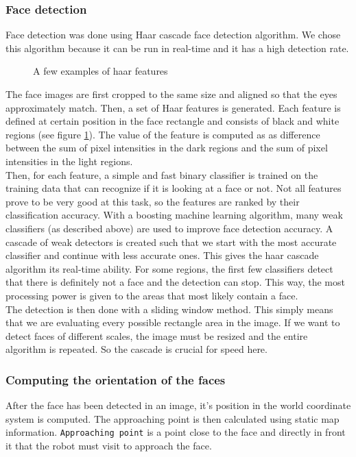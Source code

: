 \documentclass[12pt,a4paper]{article}
\begin{document}
	\subsubsection{Face detection} \label{face_detection_algorithm}
	
	Face detection was done using Haar cascade face detection algorithm. We chose this algorithm because it can be run in real-time and it has a high detection rate. \\
	
	\begin{figure}[h]
		\centering
		\caption{A few examples of haar features}
		\label{fig:haar_features}
	\end{figure}
	
	The face images are first cropped to the same size and aligned so that the eyes approximately match. Then, a set of Haar features is generated. Each feature is defined at certain position in the face rectangle and consists of black and white regions (see figure \ref{fig:haar_features}). The value of the feature is computed as as difference between the sum of pixel intensities in the dark regions and the sum of pixel intensities in the light regions. \\
	
	Then, for each feature, a simple and fast binary classifier is trained on the training data that can recognize if it is looking at a face or not. Not all features prove to be very good at this task, so the features are ranked by their classification accuracy. With a boosting machine learning algorithm, many weak classifiers (as described above) are used to improve face detection accuracy. A cascade of weak detectors is created such that we start with the most accurate classifier and continue with less accurate ones. This gives the haar cascade algorithm its real-time ability. For some regions, the first few classifiers detect that there is definitely not a face and the detection can stop. This way, the most processing power is given to the areas that most likely contain a face. \\
	
	The detection is then done with a sliding window method. This simply means that we are evaluating every possible rectangle area in the image. If we want to detect faces of different scales, the image must be resized and the entire algorithm is repeated. So the cascade is crucial for speed here. \\
	
	\subsubsection{Computing the orientation of the faces} \label{face_orientation_computation}
	After the face has been detected in an image, it's position in the world coordinate system is computed. The approaching point is then calculated using static map information. \texttt{Approaching point} is a point close to the face and directly in front it that the robot must visit to approach the face. \\
	
\end{document}
